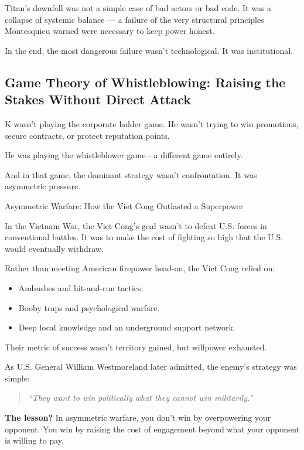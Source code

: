 \medskip

Titan's downfall was not a simple case of bad actors or bad code. It was a collapse of systemic balance — a failure of the very structural principles Montesquieu warned were necessary to keep power honest.

\medskip

In the end, the most dangerous failure wasn't technological. It was institutional.


\subsection{Game Theory of Whistleblowing: Raising the Stakes Without Direct Attack}

K wasn’t playing the corporate ladder game. 
He wasn’t trying to win promotions, secure contracts, or protect reputation points.

He was playing the whistleblower game—a different game entirely.

And in that game, the dominant strategy wasn’t confrontation. 
It was asymmetric pressure.

\medskip

\begin{HistoricalSidebar}{Asymmetric Warfare: How the Viet Cong Outlasted a Superpower}

In the Vietnam War, the Viet Cong’s goal wasn’t to defeat U.S. forces in conventional battles.
It was to make the cost of fighting so high that the U.S. would eventually withdraw.

\medskip

Rather than meeting American firepower head-on, the Viet Cong relied on:

\begin{itemize}
    \item Ambushes and hit-and-run tactics.
    \item Booby traps and psychological warfare.
    \item Deep local knowledge and an underground support network.
\end{itemize}

Their metric of success wasn’t territory gained, but willpower exhausted.

\medskip

As U.S. General William Westmoreland later admitted, the enemy’s strategy was simple:

\begin{quote}
    \textit{``They want to win politically what they cannot win militarily.''}
\end{quote}

\textbf{The lesson?} In asymmetric warfare, you don’t win by overpowering your opponent.
You win by raising the cost of engagement beyond what your opponent is willing to pay.

\end{HistoricalSidebar}

